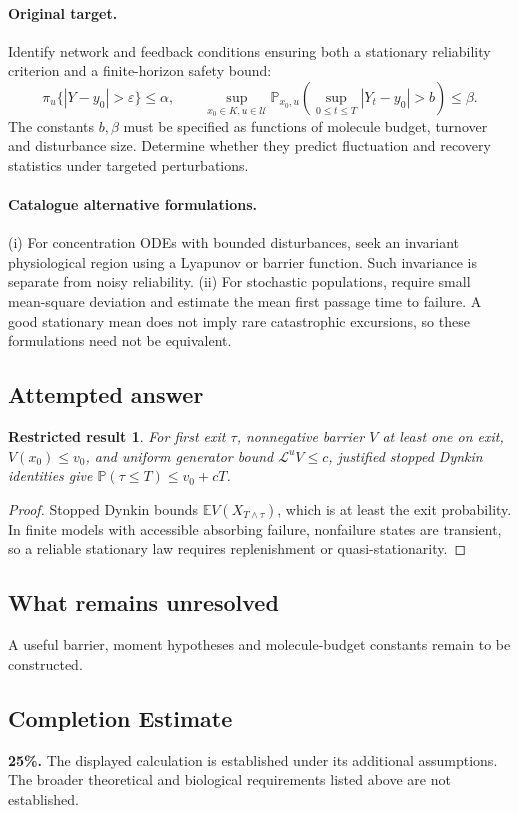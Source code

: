 \documentclass[11pt]{article}
\newcommand{\E}{\mathbb E}
\newcommand{\Prob}{\mathbb P}
\providecommand{\E}{\mathbb E}
\providecommand{\Prob}{\mathbb P}
\newtheorem{attemptresult}{Restricted result}[section]
\begin{document}
\paragraph{Original target.}
Identify network and feedback conditions ensuring both a stationary reliability criterion and a finite-horizon safety bound:
\[\pi_u\{|Y-y_0|>\varepsilon\}\le\alpha,\qquad \sup_{x_0\in K,u\in\mathcal U}\Prob_{x_0,u}\!\left(\sup_{0\le t\le T}|Y_t-y_0|>b\right)\le\beta.\]
The constants $b,\beta$ must be specified as functions of molecule budget, turnover and disturbance size. Determine whether they predict fluctuation and recovery statistics under targeted perturbations.
\paragraph{Catalogue alternative formulations.}
(i) For concentration ODEs with bounded disturbances, seek an invariant physiological region using a Lyapunov or barrier function. Such invariance is separate from noisy reliability. (ii) For stochastic populations, require small mean-square deviation and estimate the mean first passage time to failure. A good stationary mean does not imply rare catastrophic excursions, so these formulations need not be equivalent.
\subsection{Attempted answer}
\begin{attemptresult}
For first exit $\tau$, nonnegative barrier $V$ at least one on exit, $V(x_0)\leq v_0$, and uniform generator bound $\mathcal L^uV\leq c$, justified stopped Dynkin identities give $\Prob(\tau\leq T)\leq v_0+cT$.
\end{attemptresult}
\begin{proof}
Stopped Dynkin bounds $\E V(X_{T\wedge\tau})$, which is at least the exit probability. In finite models with accessible absorbing failure, nonfailure states are transient, so a reliable stationary law requires replenishment or quasi-stationarity.
\end{proof}
\subsection{What remains unresolved}
A useful barrier, moment hypotheses and molecule-budget constants remain to be constructed.
\subsection{Completion Estimate}
\textbf{25\%.} The displayed calculation is established under its additional assumptions. The broader theoretical and biological requirements listed above are not established.
\end{document}
